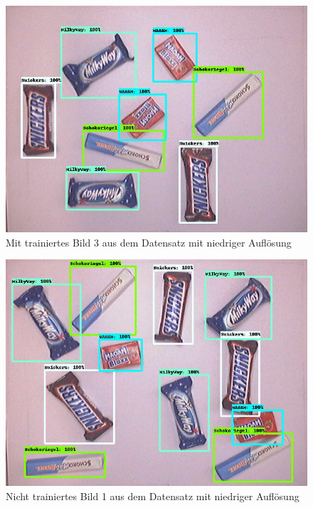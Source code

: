     \begin{figure}[H]
        \centering
        \includegraphics[angle = 90, width = \textwidth]{Bilder/models/model_comparison/faster_rcnn_resnet101_v1_640x640_coco17_tpu-8/trained_3.jpg}
        \caption{Mit trainiertes Bild 3 aus dem Datensatz mit niedriger Auflösung}
    \end{figure}
    
    \begin{figure}[H]
        \centering
        \includegraphics[angle = 90, width = \textwidth]{Bilder/models/model_comparison/faster_rcnn_resnet101_v1_640x640_coco17_tpu-8/non_trained_1.jpg}
        \caption{Nicht trainiertes Bild 1 aus dem Datensatz mit niedriger Auflösung}
    \end{figure}
    
